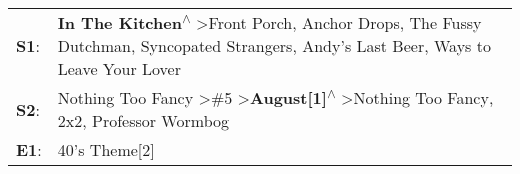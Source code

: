 \begin{supertabular}{p{0.03\textwidth}p{0.92\textwidth}}
 \textbf{S1}:  &  \textbf{In The Kitchen\textsuperscript{$\wedge$}} \textgreater \enspace Front Porch\textsuperscript{}, \enspace Anchor Drops\textsuperscript{}, \enspace The Fussy Dutchman\textsuperscript{}, \enspace Syncopated Strangers\textsuperscript{}, \enspace Andy's Last Beer\textsuperscript{},  Ways to Leave Your Lover\textsuperscript{}  \enspace  \\
 \textbf{S2}:  &                                                           Nothing Too Fancy\textsuperscript{} \textgreater \enspace \#5\textsuperscript{} \textgreater \enspace \textbf{August[1]\textsuperscript{$\wedge$}} \textgreater \enspace Nothing Too Fancy\textsuperscript{}, \enspace 2x2\textsuperscript{}, \enspace Professor Wormbog\textsuperscript{}  \enspace  \\
 \textbf{E1}:  &                                                                                                                                                                                                                                                                                                                      40's Theme[2]\textsuperscript{}  \enspace  \\
\end{supertabular}
